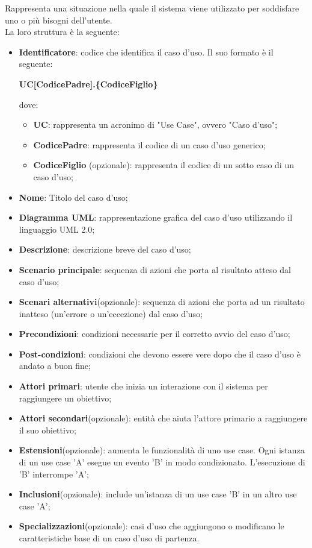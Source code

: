 Rappresenta una situazione nella quale il sistema viene utilizzato per soddisfare uno o più bisogni dell'utente.\\
La loro struttura è la seguente:
\begin{itemize}
\item \textbf{Identificatore}: codice che identifica il caso d'uso. Il suo formato è il seguente:
\begin{center}
\textbf{UC[CodicePadre].\{CodiceFiglio\}}\\
\end{center}
dove:
\begin{itemize}
\item \textbf{UC}: rappresenta un acronimo di "Use Case", ovvero "Caso d'uso";
\item \textbf{CodicePadre}: rappresenta il codice di un caso d'uso generico;
\item \textbf{CodiceFiglio} (opzionale): rappresenta il codice di un sotto caso di un caso d'uso;
\end{itemize}
\item \textbf{Nome}: Titolo del caso d'uso;
\item \textbf{Diagramma UML}: rappresentazione grafica del caso d'uso utilizzando il linguaggio UML 2.0; 
\item \textbf{Descrizione}: descrizione breve del caso d'uso;
\item \textbf{Scenario principale}: sequenza di azioni che porta al risultato atteso dal caso d'uso;
\item \textbf{Scenari alternativi}(opzionale): sequenza di azioni che porta ad un risultato inatteso (un'errore o un'eccezione) dal caso d'uso;
\item \textbf{Precondizioni}: condizioni necessarie per il corretto avvio del caso d'uso;
\item \textbf{Post-condizioni}: condizioni che devono essere vere dopo che il caso d'uso è andato a buon fine;
\item \textbf{Attori primari}: utente che inizia un interazione con il sistema per raggiungere un obiettivo;
\item \textbf{Attori secondari}(opzionale): entità che aiuta l'attore primario a raggiungere il suo obiettivo;
\item \textbf{Estensioni}(opzionale): aumenta le funzionalità di uno use case. Ogni istanza di un use case 'A' esegue un evento 'B' in modo condizionato. L'esecuzione di 'B' interrompe 'A';
\item \textbf{Inclusioni}(opzionale): include un'istanza di un use case 'B' in un altro use case 'A';
\item \textbf{Specializzazioni}(opzionale): casi d'uso che aggiungono o modificano le caratteristiche base di un caso d'uso di partenza.
\end{itemize}